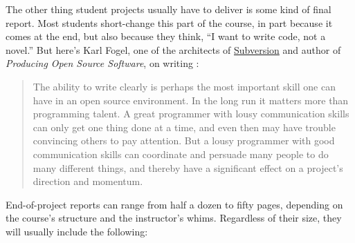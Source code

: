 \documentclass{report}
\begin{document}
The other thing student projects usually have to deliver is some kind
of final report.  Most students short-change this part of the course,
in part because it comes at the end, but also because they think, ``I
want to write code, not a novel.''  But here's Karl Fogel, one of the
architects of \url{Subversion} and author of \emph{Producing Open
Source Software}, on writing \cite{b:fogel-producing-open-source}:

\begin{quotation}

  The ability to write clearly is perhaps the most important skill one
  can have in an open source environment.  In the long run it matters
  more than programming talent.  A great programmer with lousy
  communication skills can only get one thing done at a time, and even
  then may have trouble convincing others to pay attention.  But a
  lousy programmer with good communication skills can coordinate and
  persuade many people to do many different things, and thereby have a
  significant effect on a project's direction and momentum.

\end{quotation}

End-of-project reports can range from half a dozen to fifty pages,
depending on the course's structure and the instructor's whims.
Regardless of their size, they will usually include the following:
\end{document}

